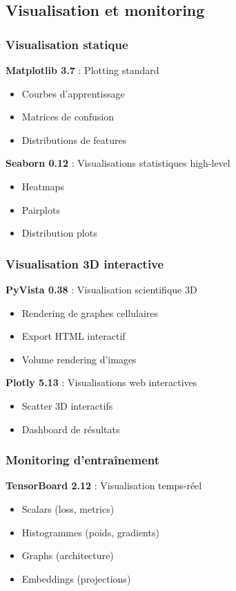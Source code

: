 \subsection{Visualisation et monitoring}

\subsubsection{Visualisation statique}

\textbf{Matplotlib 3.7} : Plotting standard
\begin{itemize}
    \item Courbes d'apprentissage
    \item Matrices de confusion
    \item Distributions de features
\end{itemize}

\textbf{Seaborn 0.12} : Visualisations statistiques high-level
\begin{itemize}
    \item Heatmaps
    \item Pairplots
    \item Distribution plots
\end{itemize}

\subsubsection{Visualisation 3D interactive}

\textbf{PyVista 0.38} : Visualisation scientifique 3D
\begin{itemize}
    \item Rendering de graphes cellulaires
    \item Export HTML interactif
    \item Volume rendering d'images
\end{itemize}

\textbf{Plotly 5.13} : Visualisations web interactives
\begin{itemize}
    \item Scatter 3D interactifs
    \item Dashboard de résultats
\end{itemize}

\subsubsection{Monitoring d'entraînement}

\textbf{TensorBoard 2.12} : Visualisation temps-réel
\begin{itemize}
    \item Scalars (loss, metrics)
    \item Histogrammes (poids, gradients)
    \item Graphs (architecture)
    \item Embeddings (projections)
\end{itemize}

